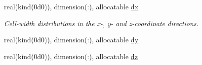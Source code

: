 \textbf{ }\par
\begin{DoxyCompactItemize}
\item 
real(kind(0d0)), dimension(\+:), allocatable \hyperlink{namespacem__global__parameters_ac96de935d1ac1a172537dfcba610b976}{dx}
\begin{DoxyCompactList}\small\item\em Cell-\/width distributions in the x-\/, y-\/ and z-\/coordinate directions. \end{DoxyCompactList}\item 
real(kind(0d0)), dimension(\+:), allocatable \hyperlink{namespacem__global__parameters_abeca739b09557ccbf37b2ec35b0e73cc}{dy}
\item 
real(kind(0d0)), dimension(\+:), allocatable \hyperlink{namespacem__global__parameters_a30d96803eb46c67ff4f0f1d7c7b92a37}{dz}
\end{DoxyCompactItemize}

